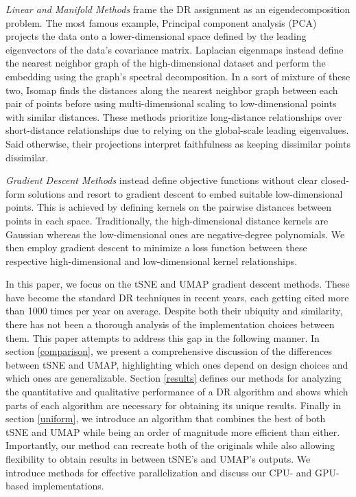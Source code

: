 \documentclass{article}
\theoremstyle{definition}
\begin{document}
\textit{Linear and Manifold Methods} frame the DR assignment as an eigendecomposition problem. The most famous example, Principal component analysis (PCA) projects the
data onto a lower-dimensional space defined by the leading eigenvectors of the data's covariance matrix. Laplacian eigenmaps \cite{belkin2003laplacian} instead define the nearest neighbor
graph of the high-dimensional dataset and perform the embedding using the graph's spectral decomposition. In a sort of mixture of these two, Isomap \cite{tenenbaum2000global} finds the
distances along the nearest neighbor graph between each pair of points before using multi-dimensional scaling to low-dimensional points with similar distances.
These methods prioritize long-distance relationships over short-distance relationships due to relying on the global-scale leading eigenvalues. Said
otherwise, their projections interpret faithfulness as keeping dissimilar points dissimilar.

\textit{Gradient Descent Methods} instead define objective functions without clear closed-form solutions and resort to gradient descent to embed
suitable low-dimensional points. This is achieved by defining kernels on the pairwise distances between points in each space. Traditionally, the
high-dimensional distance kernels are Gaussian whereas the low-dimensional ones are negative-degree polynomials. We then employ gradient descent to minimize
a loss function between these respective high-dimensional and low-dimensional kernel relationships.

In this paper, we focus on the tSNE \cite{van2008visualizing} and UMAP \cite{mcinnes2018umap} gradient descent methods. These have become the standard DR
techniques in recent years, each getting cited more than
1000 times per year on average. Despite both their ubiquity and similarity, there has not been a thorough analysis of the implementation choices between them.
 This paper attempts to address this gap in the following manner. In section \ref{comparison}, we present a comprehensive discussion of the
differences between tSNE and UMAP, highlighting which ones depend on design choices and which ones are generalizable. Section \ref{results} defines our methods for
analyzing the quantitative and qualitative performance of a DR algorithm and shows which parts of each algorithm are necessary for obtaining its unique results. Finally in
section \ref{uniform}, we introduce an algorithm that combines the best of both tSNE and UMAP while being an order of magnitude more efficient than either.
Importantly, our method can recreate both of the originals while also allowing flexibility to obtain results in between tSNE's and UMAP's outputs. We introduce
methods for effective parallelization and discuss our CPU- and GPU-based implementations.
\end{document}
